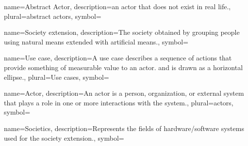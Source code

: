 {name={Abstract Actor},
description={an actor that does not exist in real life.},
plural={abstract actors},
symbol={}
}

{name={Society extension},
description={The society obtained by grouping people using natural means
extended with artificial means.},
symbol={}
}

{name={Use case},
description={A use case describes a sequence of actions that provide something
of measurable value to an actor. and is drawn as a horizontal ellipse.},
plural={Use cases}, 
symbol={} 
}

{name={Actor},
description={An actor is a person, organization, or external system that plays a
role in one or more interactions with the system.},
plural={actors},
symbol={}
}

{name={Societics},
description={Represents the fields of hardware/software
systems used for the society extension.},
symbol={}
}

